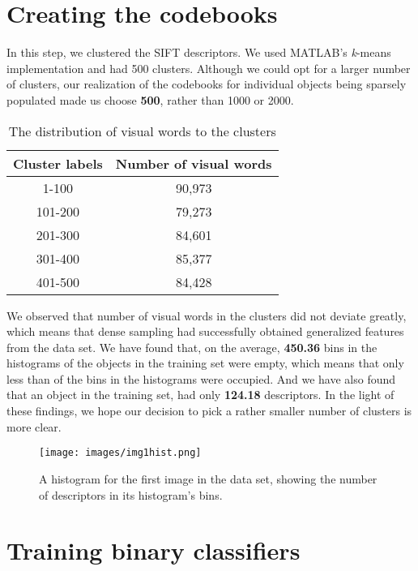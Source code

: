 \documentclass[conference]{IEEEtran}
\newcommand{\thirdsection}{Creating the codebooks}
\newcommand{\fourthsection}{Training binary classifiers}
\begin{document}
\section{\thirdsection}

In this step, we clustered the SIFT descriptors. We used MATLAB's \textit{k}-means implementation\cite{kmeans-matlab} and had 500 clusters. Although we could opt for a larger number of clusters, our realization of the codebooks for individual objects being sparsely populated made us choose \textbf{500}, rather than 1000 or 2000.

\begin{table}[!h]
\caption{The distribution of visual words to the clusters}
\label{table_example}
\centering
\begin{tabular}{|c||c|}
\hline
Cluster labels & Number of visual words\\
\hline
1-100 & 90,973 \\
\hline
101-200 & 79,273 \\
\hline
201-300 & 84,601 \\
\hline
301-400 & 85,377 \\
\hline
401-500 & 84,428 \\
\hline
\end{tabular}
\end{table}

We observed that number of visual words in the clusters did not deviate greatly, which means that dense sampling had successfully obtained generalized features from the data set. We have found that, on the average, \textbf{450.36} bins in the histograms of the objects in the training set were empty, which means that only less than  of the bins in the histograms were occupied. And we have also found that an object in the training set, had only \textbf{124.18} descriptors. In the light of these findings, we hope our decision to pick a rather smaller number of clusters is more clear.

\begin{figure}[!h]
    \centering
    \texttt{[image: images/img1hist.png]}
    \caption{A histogram for the first image in the data set, showing the number of descriptors in its histogram's bins.}
    \label{fig:my_label}
\end{figure}

\section{\fourthsection}
\end{document}
